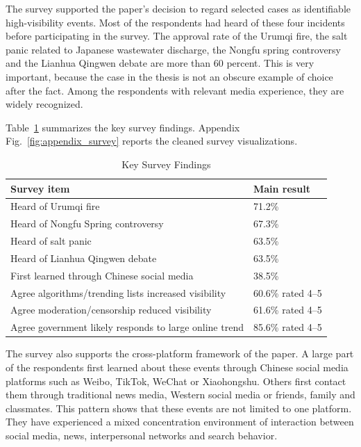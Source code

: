 \documentclass[conference]{IEEEtran}
\begin{document}
The survey supported the paper's decision to regard selected cases as identifiable high-visibility events. Most of the respondents had heard of these four incidents before participating in the survey. The approval rate of the Urumqi fire, the salt panic related to Japanese wastewater discharge, the Nongfu spring controversy and the Lianhua Qingwen debate are more than 60 percent. This is very important, because the case in the thesis is not an obscure example of choice after the fact. Among the respondents with relevant media experience, they are widely recognized.

Table~\ref{tab:survey_summary} summarizes the key survey findings. Appendix Fig.~\ref{fig:appendix_survey} reports the cleaned survey visualizations.

\begin{table}[t]
\centering
\caption{Key Survey Findings}
\label{tab:survey_summary}
\footnotesize
\begin{tabular}{p{}p{}}
\toprule
Survey item & Main result \\
\midrule
Heard of Urumqi fire & 71.2\% \\
Heard of Nongfu Spring controversy & 67.3\% \\
Heard of salt panic & 63.5\% \\
Heard of Lianhua Qingwen debate & 63.5\% \\
First learned through Chinese social media & 38.5\% \\
Agree algorithms/trending lists increased visibility & 60.6\% rated 4--5 \\
Agree moderation/censorship reduced visibility & 61.6\% rated 4--5 \\
Agree government likely responds to large online trend & 85.6\% rated 4--5 \\
\bottomrule
\end{tabular}
\end{table}

The survey also supports the cross-platform framework of the paper. A large part of the respondents first learned about these events through Chinese social media platforms such as Weibo, TikTok, WeChat or Xiaohongshu. Others first contact them through traditional news media, Western social media or friends, family and classmates. This pattern shows that these events are not limited to one platform. They have experienced a mixed concentration environment of interaction between social media, news, interpersonal networks and search behavior.
\end{document}
